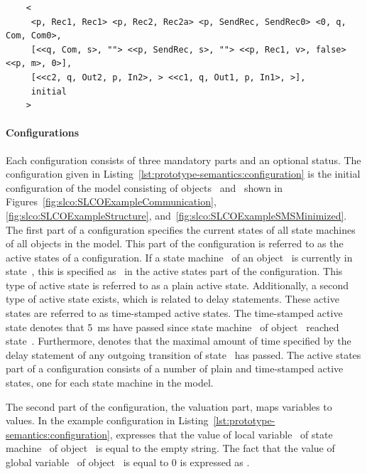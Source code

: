 \begin{listing}
  \lstset{
    language=cs,
    caption=The initial configuration of the running example,
    label=lst:prototype-semantics:configuration,
    numbers=none
  }
  \begin{lstlisting}
    <
     <p, Rec1, Rec1> <p, Rec2, Rec2a> <p, SendRec, SendRec0> <0, q, Com, Com0>,
     [<<q, Com, s>, ""> <<p, SendRec, s>, ""> <<p, Rec1, v>, false> <<p, m>, 0>],
     [<<c2, q, Out2, p, In2>, > <<c1, q, Out1, p, In1>, >],
     initial
    >
  \end{lstlisting}
\end{listing}

\paragraph{Configurations}
Each configuration consists of three mandatory parts and an optional status.
The configuration given in Listing~\ref{lst:prototype-semantics:configuration} is the initial configuration of the model consisting of objects~ and~ shown in Figures~\ref{fig:slco:SLCOExampleCommunication}, \ref{fig:slco:SLCOExampleStructure}, and~\ref{fig:slco:SLCOExampleSMSMinimized}.
The first part of a configuration specifies the current states of all state machines of all objects in the \SLCO model.
This part of the configuration is referred to as the active states of a configuration.
If a state machine~ of an object~ is currently in state~, this is specified as~ in the active states part of the configuration.
This type of active state is referred to as a plain active state.
Additionally, a second type of active state exists, which is related to delay statements.
These active states are referred to as time-stamped active states.
The time-stamped active state  denotes that 5~ms have passed since state machine~ of object~ reached state~.
Furthermore,  denotes that the maximal amount of time specified by the delay statement of any outgoing transition of state~ has passed.
The active states part of a configuration consists of a number of plain and time-stamped active states, one for each state machine in the model.

The second part of the configuration, the valuation part, maps variables to values.
In the example configuration in Listing~\ref{lst:prototype-semantics:configuration},  expresses that the value of local variable~ of state machine~ of object~ is equal to the empty string.
The fact that the value of global variable~ of object~ is equal to 0 is expressed as .

